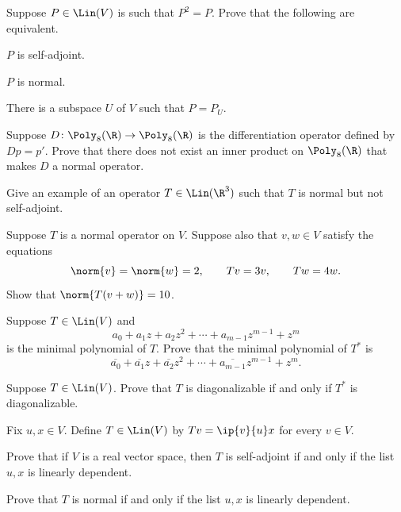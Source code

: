 \begin{exercise}
Suppose $P\in\Lin(V)$ is such that $P^2=P$. Prove that the following are
equivalent.
\begin{parts}
\item $P$ is self-adjoint.
\item $P$ is normal.
\item There is a subspace $U$ of $V$ such that $P=P_U$.
\end{parts}
\end{exercise}

\begin{exercise}
Suppose $D\colon\Poly_8(\R)\to\Poly_8(\R)$ is the differentiation operator
defined by $Dp=p'$. Prove that there does not exist an inner product on
$\Poly_8(\R)$ that makes $D$ a normal operator.
\end{exercise}

\begin{exercise}
Give an example of an operator $T\in\Lin(\R^3)$ such that $T$ is normal but not
self-adjoint.
\end{exercise}

\begin{exercise}
Suppose $T$ is a normal operator on $V$. Suppose also that $v,w\in V$ satisfy
the equations
\[ \norm{v}=\norm{w}=2, \qquad Tv=3v, \qquad Tw=4w. \]
Show that $\norm{T(v+w)}=10$.
\end{exercise}

\begin{exercise}
Suppose $T\in\Lin(V)$ and
\[ a_0+a_1z+a_2z^2+\cdots+a_{m-1}z^{m-1}+z^m \]
is the minimal polynomial of $T$. Prove that the minimal polynomial of $T^*$ is
\[ \overline{a_0}+\overline{a_1}z+\overline{a_2}z^2+\cdots
   +\overline{a_{m-1}}z^{m-1}+z^m. \]
\end{exercise}

\begin{exercise}
Suppose $T\in\Lin(V)$. Prove that $T$ is diagonalizable if and only if $T^*$ is
diagonalizable.
\end{exercise}

\begin{exercise}
Fix $u,x\in V$. Define $T\in\Lin(V)$ by $Tv=\ip{v}{u}x$ for every $v\in V$.
\begin{parts}
\item Prove that if $V$ is a real vector space, then $T$ is self-adjoint if and
  only if the list $u,x$ is linearly dependent.
\item Prove that $T$ is normal if and only if the list $u,x$ is linearly
  dependent.
\end{parts}
\end{exercise}


